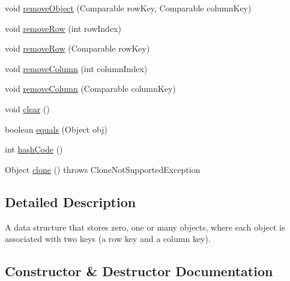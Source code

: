 \begin{DoxyCompactItemize}
\item 
void \mbox{\hyperlink{classorg_1_1jfree_1_1data_1_1_keyed_objects2_d_ac2c8e82dee1c5b5a2c9b89d4747264fd}{remove\+Object}} (Comparable row\+Key, Comparable column\+Key)
\item 
void \mbox{\hyperlink{classorg_1_1jfree_1_1data_1_1_keyed_objects2_d_a402d4db2a4f3d6b95654e80e8c374bb3}{remove\+Row}} (int row\+Index)
\item 
void \mbox{\hyperlink{classorg_1_1jfree_1_1data_1_1_keyed_objects2_d_a98a8ebeb70498799f225190f73e18fa0}{remove\+Row}} (Comparable row\+Key)
\item 
void \mbox{\hyperlink{classorg_1_1jfree_1_1data_1_1_keyed_objects2_d_a5c8fb22f412dab0f50a762d2676818d3}{remove\+Column}} (int column\+Index)
\item 
void \mbox{\hyperlink{classorg_1_1jfree_1_1data_1_1_keyed_objects2_d_a488bbadbf49f3b5b35d6cc6add250f68}{remove\+Column}} (Comparable column\+Key)
\item 
void \mbox{\hyperlink{classorg_1_1jfree_1_1data_1_1_keyed_objects2_d_a00c4babae500b2ec696d877b2461ddda}{clear}} ()
\item 
boolean \mbox{\hyperlink{classorg_1_1jfree_1_1data_1_1_keyed_objects2_d_a495ae6c3b2edbeee6c35249d2437b707}{equals}} (Object obj)
\item 
int \mbox{\hyperlink{classorg_1_1jfree_1_1data_1_1_keyed_objects2_d_a7b1a3d222d8fbb68771ec0d895bb4efb}{hash\+Code}} ()
\item 
Object \mbox{\hyperlink{classorg_1_1jfree_1_1data_1_1_keyed_objects2_d_ae84acbd0aefbcbd363abb34ee9b8eb44}{clone}} ()  throws Clone\+Not\+Supported\+Exception 
\end{DoxyCompactItemize}


\subsection{Detailed Description}
A data structure that stores zero, one or many objects, where each object is associated with two keys (a \textquotesingle{}row\textquotesingle{} key and a \textquotesingle{}column\textquotesingle{} key). 

\subsection{Constructor \& Destructor Documentation}
\mbox{\label{classorg_1_1jfree_1_1data_1_1_keyed_objects2_d_a92a69fb5b817d2c4fd149cc4f5fec0dd}} 
